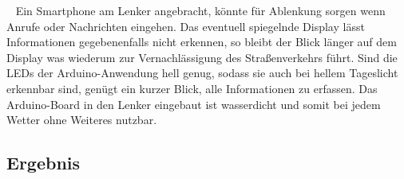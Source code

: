 \begin{description}[leftmargin=0.7cm,style=nextline]
  \item[Verkehrssicherheit] ~ Ein \gls{Smartphone} am Lenker angebracht, könnte für Ablenkung sorgen wenn Anrufe oder Nachrichten eingehen. Das eventuell spiegelnde Display lässt Informationen gegebenenfalls nicht erkennen, so bleibt der Blick länger auf dem Display was wiederum zur Vernachlässigung des Straßenverkehrs führt. Sind die \glspl{LED} der \gls{Arduino}-Anwendung hell genug, sodass sie auch bei hellem Tageslicht erkennbar sind, genügt ein kurzer Blick, alle Informationen zu erfassen. Das \gls{Arduino}-Board in den Lenker eingebaut ist wasserdicht und somit bei jedem Wetter ohne Weiteres nutzbar.\\ 
\end{description}
\subsection*{Ergebnis}  
